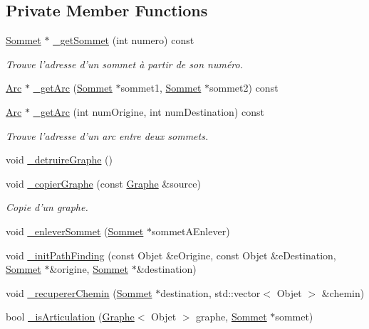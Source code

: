 \subsection*{Private Member Functions}
\begin{DoxyCompactItemize}
\item 
\hyperlink{class_graphe_1_1_sommet}{Sommet} $\ast$ \hyperlink{class_graphe_ac798e3b65595635aaf3e2f83e9a4c58e}{\_\-getSommet} (int numero) const 
\begin{DoxyCompactList}\small\item\em Trouve l'adresse d'un sommet à partir de son numéro. \end{DoxyCompactList}\item 
\hyperlink{class_graphe_1_1_arc}{Arc} $\ast$ \hyperlink{class_graphe_a5d918be3eb2738ce483dd804d0b8187d}{\_\-getArc} (\hyperlink{class_graphe_1_1_sommet}{Sommet} $\ast$sommet1, \hyperlink{class_graphe_1_1_sommet}{Sommet} $\ast$sommet2) const 
\item 
\hyperlink{class_graphe_1_1_arc}{Arc} $\ast$ \hyperlink{class_graphe_a3874c74eb79d536e7974fc5ae218ce1c}{\_\-getArc} (int numOrigine, int numDestination) const 
\begin{DoxyCompactList}\small\item\em Trouve l'adresse d'un arc entre deux sommets. \end{DoxyCompactList}\item 
void \hyperlink{class_graphe_a8405369dbe4854dd624e140539717fab}{\_\-detruireGraphe} ()
\item 
void \hyperlink{class_graphe_a1b8cfc5964a91ed326b4db134471d6e0}{\_\-copierGraphe} (const \hyperlink{class_graphe}{Graphe} \&source)
\begin{DoxyCompactList}\small\item\em Copie d'un graphe. \end{DoxyCompactList}\item 
void \hyperlink{class_graphe_a2c22cb6d5282d83c940872ec52327d5e}{\_\-enleverSommet} (\hyperlink{class_graphe_1_1_sommet}{Sommet} $\ast$sommetAEnlever)
\item 
void \hyperlink{class_graphe_aae4a7becaa21116b48dbe8d0fbd4a57d}{\_\-initPathFinding} (const Objet \&eOrigine, const Objet \&eDestination, \hyperlink{class_graphe_1_1_sommet}{Sommet} $\ast$\&origine, \hyperlink{class_graphe_1_1_sommet}{Sommet} $\ast$\&destination)
\item 
void \hyperlink{class_graphe_ad45ebb3761173879209aca61ed7d825b}{\_\-recupererChemin} (\hyperlink{class_graphe_1_1_sommet}{Sommet} $\ast$destination, std::vector$<$ Objet $>$ \&chemin)
\item 
bool \hyperlink{class_graphe_ac62e72dd9006cc38115edf51d7c69df2}{\_\-isArticulation} (\hyperlink{class_graphe}{Graphe}$<$ Objet $>$ graphe, \hyperlink{class_graphe_1_1_sommet}{Sommet} $\ast$sommet)
\end{DoxyCompactItemize}
